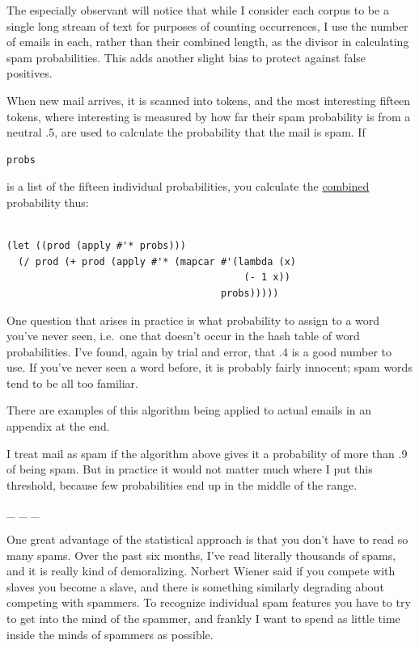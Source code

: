 The especially observant will notice that while I consider each corpus
to be a single long stream of text for purposes of counting occurrences,
I use the number of emails in each, rather than their combined length,
as the divisor in calculating spam probabilities. This adds another
slight bias to protect against false positives.

When new mail arrives, it is scanned into tokens, and the most
interesting fifteen tokens, where interesting is measured by how far
their spam probability is from a neutral .5, are used to calculate the
probability that the mail is spam. If

\begin{verbatim}
probs
\end{verbatim}

is a list of the fifteen individual probabilities, you calculate the
\href{naivebayes.html}{combined} probability thus:

\begin{verbatim}

(let ((prod (apply #'* probs)))
  (/ prod (+ prod (apply #'* (mapcar #'(lambda (x)
                                         (- 1 x))
                                     probs)))))
\end{verbatim}

One question that arises in practice is what probability to assign to a
word you've never seen, i.e.~one that doesn't occur in the hash table of
word probabilities. I've found, again by trial and error, that .4 is a
good number to use. If you've never seen a word before, it is probably
fairly innocent; spam words tend to be all too familiar.

There are examples of this algorithm being applied to actual emails in
an appendix at the end.

I treat mail as spam if the algorithm above gives it a probability of
more than .9 of being spam. But in practice it would not matter much
where I put this threshold, because few probabilities end up in the
middle of the range.

\_ \_ \_

One great advantage of the statistical approach is that you don't have
to read so many spams. Over the past six months, I've read literally
thousands of spams, and it is really kind of demoralizing. Norbert
Wiener said if you compete with slaves you become a slave, and there is
something similarly degrading about competing with spammers. To
recognize individual spam features you have to try to get into the mind
of the spammer, and frankly I want to spend as little time inside the
minds of spammers as possible.

